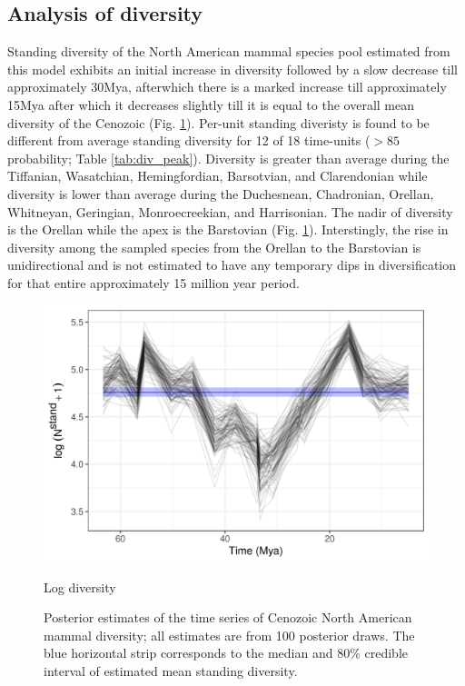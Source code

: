\documentclass[12pt,letterpaper]{article}
\begin{document}
\subsection*{Analysis of diversity}
Standing diversity of the North American mammal species pool estimated from this model exhibits an initial increase in diversity followed by a slow decrease till approximately 30Mya, afterwhich there is a marked increase till approximately 15Mya after which it decreases slightly till it is equal to the overall mean diversity of the Cenozoic (Fig. \ref{fig:diversity_est}). Per-unit standing diveristy is found to be different from average standing diversity for 12 of 18 time-units (\(> 85\) probability; Table \ref{tab:div_peak}). Diversity is greater than average during the Tiffanian, Wasatchian, Hemingfordian, Barsotvian, and Clarendonian while diversity is lower than average during the Duchesnean, Chadronian, Orellan, Whitneyan, Geringian, Monroecreekian, and Harrisonian. The nadir of diversity is the Orellan while the apex is the Barstovian (Fig. \ref{fig:diversity_est}). Interstingly, the rise in diversity among the sampled species from the Orellan to the Barstovian is unidirectional and is not estimated to have any temporary dips in diversification for that entire approximately 15 million year period.
\begin{figure}[ht]
  \centering
  \includegraphics[width=\textwidth,height=0.5\textheight,keepaspectratio=true]{figure/log_diversity}
  \caption{Log diversity}
  \caption[Estimated mammal log-diversity for the Cenozoic]{Posterior estimates of the time series of Cenozoic North American mammal diversity; all estimates are from 100 posterior draws. The blue horizontal strip corresponds to the median and 80\% credible interval of estimated mean standing diversity.} 
  \label{fig:diversity_est}
\end{figure}
\end{document}
